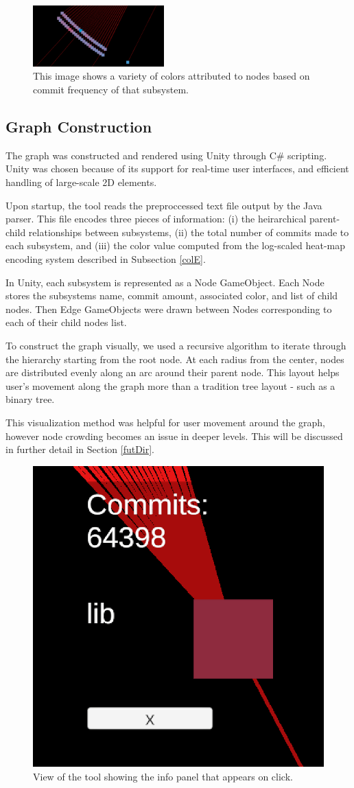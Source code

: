 \documentclass[conference]{IEEEtran}
\begin{document}
\begin{figure}[h!]
	\centering
	\includegraphics[width=0.45\textwidth]{randomSection.png}
	\caption{This image shows a variety of colors attributed to nodes based on commit frequency of that subsystem.}
	\label{in}
\end{figure}

\subsection{Graph Construction}
\label{graphC}
The graph was constructed and rendered using Unity through C\# scripting. Unity was chosen because of its support for real-time user interfaces, and efficient handling of large-scale 2D elements.

Upon startup, the tool reads the preproccessed text file output by the Java parser. This file encodes three pieces of information: (i) the heirarchical parent-child relationships between subsystems, (ii) the total number of commits made to each subsystem, and (iii) the color value computed from the log-scaled heat-map encoding system described in Subsection \ref{colE}.

In Unity, each subsystem is represented as a Node GameObject. Each Node stores the subsystems name, commit amount, associated color, and list of child nodes. Then Edge GameObjects were drawn between Nodes corresponding to each of their child nodes list.

To construct the graph visually, we used a recursive algorithm to iterate through the hierarchy starting from the root node. At each radius from the center, nodes are distributed evenly along an arc around their parent node. This layout helps user's movement along the graph more than a tradition tree layout - such as a binary tree. 

This visualization method was helpful for user movement around the graph, however node crowding becomes an issue in deeper levels. This will be discussed in further detail in Section \ref{futDir}.

\begin{figure}[h!]
	\centering
	\includegraphics[width = .3\textwidth]{commitPanel.png}
	\caption{View of the tool showing the info panel that appears on click.}
	\label{inner}
\end{figure}
\end{document}
